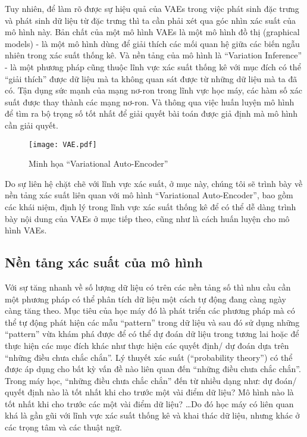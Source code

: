         Tuy nhiên, để làm rõ được sự hiệu quả của VAEs trong việc phát sinh đặc trưng và phát sinh dữ liệu từ đặc trưng thì ta cần phải xét qua góc nhìn xác suất của mô hình này.
        Bản chất của một mô hình VAEs là một mô hình đồ thị (graphical models) - là một mô hình dùng để giải thích các mối quan hệ giữa các biến ngẫu nhiên trong xác suất thống kê. Và nền tảng của mô hình là ``Variation Inference'' - là một phương pháp cũng thuộc lĩnh vực xác suất thống kê với mục đích có thể ``giải thích'' được dữ liệu mà ta không quan sát được từ những dữ liệu mà ta đã có. Tận dụng sức mạnh của mạng nơ-ron trong lĩnh vực học máy, các hàm số xác suất được thay thành các mạng nơ-ron. Và thông qua việc huấn luyện mô hình để tìm ra bộ trọng số tốt nhất để giải quyết bài toán được giả định mà mô hình cần giải quyết. 
        \begin{figure}
            \centering
            \texttt{[image: VAE.pdf]}
            \caption{Minh họa ``Variational Auto-Encoder''}
            \label{fig_VAE}
        \end{figure}
        Do sự liên hệ chặt chẽ với lĩnh vực xác suất, ở mục này, chúng tôi sẽ trình bày về nền tảng xác suất liên quan với mô hình ``Variational Auto-Encoder'', bao gồm các khái niệm, định lý trong lĩnh vực xác suất thống kê để có thể dễ dàng trình bày nội dung của VAEs ở mục tiếp theo, cũng như là cách huấn luyện cho mô hình VAEs. 
        

    \subsection{Nền tảng xác suất của mô hình} \label{chap2/subsec21}
        
        Với sự tăng nhanh về số lượng dữ liệu có trên các nền tảng số thì nhu cầu cần một phương pháp có thể phân tích dữ liệu một cách tự động đang  càng ngày càng tăng theo. Mục tiêu của học máy đó là phát triển các phương pháp mà có thể tự động phát hiện các mẫu ``pattern'' trong dữ liệu và sau đó sử dụng những ``pattern'' vừa khám phá được để có thể dự đoán dữ liệu trong tương lai hoặc để thực hiện các mục đích khác như thực hiện các quyết định/ dự đoán dựa trên ``những điều chưa chắc chắn''. Lý thuyết xác suất (``probability theory'') có thể được áp dụng cho bất kỳ vấn đề nào liên quan đến ``những điều chưa chắc chắn''. Trong máy học, ``những điều chưa chắc chắn'' đến từ nhiều dạng như: dự đoán/ quyết định nào là tốt nhất khi cho trước một vài điểm dữ liệu? Mô hình nào là tốt nhất khi cho trước các một vài điểm dữ liệu? \dots Do đó học máy có liên quan khá là gần gũi với lĩnh vực xác suất thống kê và khai thác dữ liệu, nhưng khác ở các trọng tâm và các thuật ngữ. 
        
